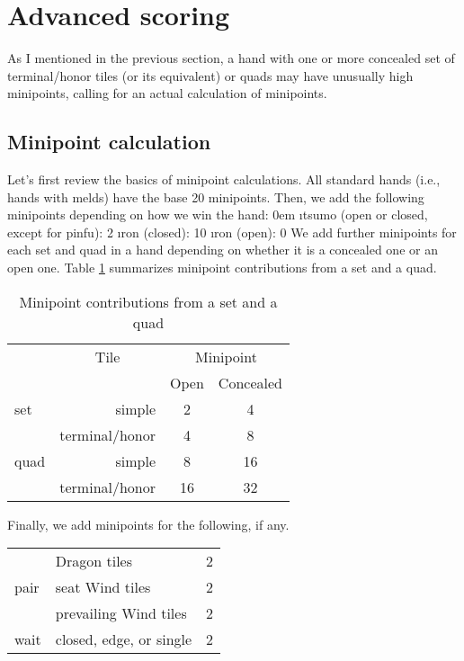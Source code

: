 \newpage

\section{Advanced scoring} \label{sec:scores2}

As I mentioned in the previous section, a hand with one or more concealed set of terminal/honor tiles (or its equivalent) or quads may have unusually high minipoints, calling for an actual calculation of minipoints. 

\subsection{Minipoint calculation}
	 
Let's first review the basics of minipoint calculations. 
All standard hands (i.e., hands with melds) have the base 20 minipoints. Then, we add the following minipoints depending on how we win the hand:
\bi \itemsep0em
\i {\jap tsumo} (open or closed, except for {\jap pinfu}): 2
\i {\jap ron} (closed): 10
\i {\jap ron} (open): 0
\ei 
We add further minipoints for each set and quad in a hand depending on whether it is a concealed one or an open one. Table \ref{tbl:minip_set} summarizes minipoint contributions from a set and a quad. 
{\begin{table}[h!]\centering\small\captionsetup{font=small}
\caption{Minipoint contributions from a set and a quad} \label{tbl:minip_set}
\begin{tabular}{l r c c}
\toprule
& \multicolumn{1}{c}{Tile} & \multicolumn{2}{c}{Minipoint}\\
&  & {\footnotesize Open} & {\footnotesize Concealed}\\
\midrule
set	& simple & 2 & 4\\
	& terminal/honor & 4 & 8\\
\midrule
quad	 & simple & 8 & 16\\
	& terminal/honor & 16 & 32\\
\bottomrule
\end{tabular}
\end{table}}

\newpage
\noindent Finally, we add minipoints for the following, if any. 

\bigskip
\begin{tabular}{l l c}
	&Dragon tiles & 2\\
pair &seat Wind tiles  & 2\\
	& prevailing Wind tiles & 2\\[\sep]
wait & closed, edge, or single & 2 \\ 
\end{tabular}

